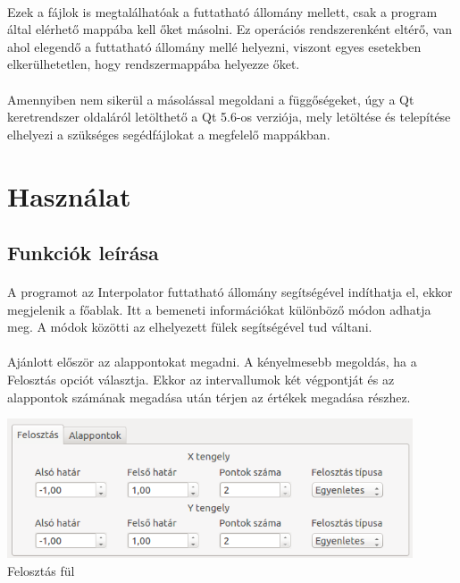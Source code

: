 \documentclass[12pt]{report}
\begin{document}
\paragraph{}
Ezek a fájlok is megtalálhatóak a futtatható állomány mellett, csak a program által elérhető mappába kell őket másolni. Ez operációs rendszerenként eltérő, van ahol elegendő a futtatható állomány mellé helyezni, viszont egyes esetekben elkerülhetetlen, hogy rendszermappába helyezze őket.
\paragraph{}
Amennyiben nem sikerül a másolással megoldani a függőségeket, úgy a Qt keretrendszer oldaláról letölthető a Qt 5.6-os verziója, mely letöltése és telepítése elhelyezi a szükséges segédfájlokat a megfelelő mappákban.

\section{Használat}

\subsection{Funkciók leírása}
\paragraph{}
A programot az Interpolator futtatható állomány segítségével indíthatja el, ekkor megjelenik a főablak.
Itt a bemeneti információkat különböző módon adhatja meg. A módok közötti az elhelyezett fülek segítségével tud váltani.
\paragraph{}
Ajánlott először az alappontokat megadni. A kényelmesebb megoldás, ha a Felosztás opciót választja. Ekkor az intervallumok két végpontját és az alappontok számának megadása után térjen az értékek megadása részhez.
\begin{center}
\includegraphics[width=12cm]{pics/gui/partition1}  \\
{\footnotesize Felosztás fül} 
\end{center}
\end{document}
